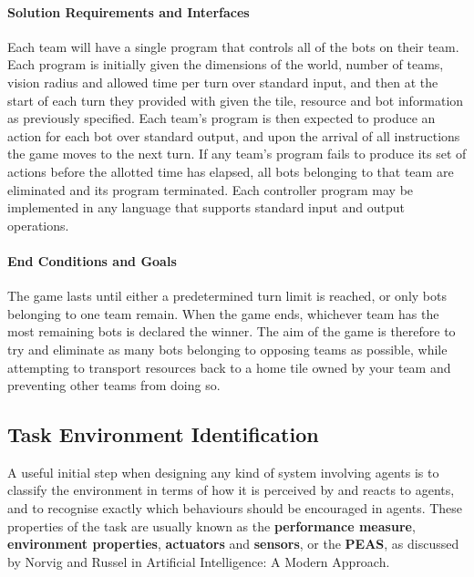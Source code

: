 \documentclass[a4paper,10pt]{article}
\begin{document}
\paragraph{Solution Requirements and Interfaces}
Each team will have a single program that controls all of the bots on their team. Each program is initially given the dimensions of the world, number of teams, vision radius and allowed time per turn over standard input, and then at the start of each turn they provided with given the tile, resource and bot information as previously specified. Each team's program is then expected to produce an action for each bot over standard output, and upon the arrival of all instructions the game moves to the next turn. If any team's program fails to produce its set of actions before the allotted time has elapsed, all bots belonging to that team are eliminated and its program terminated. Each controller program may be implemented in any language that supports standard input and output operations.

\paragraph{End Conditions and Goals}
The game lasts until either a predetermined turn limit is reached, or only bots belonging to one team remain. When the game ends, whichever team has the most remaining bots is declared the winner. The aim of the game is therefore to try and eliminate as many bots belonging to opposing teams as possible, while attempting to transport resources back to a home tile owned by your team and preventing other teams from doing so.

\subsection{Task Environment Identification}
A useful initial step when designing any kind of system involving agents is to classify the environment in terms of how it is perceived by and reacts to agents, and to recognise exactly which behaviours should be encouraged in agents. These properties of the task are usually known as the \textbf{performance measure}, \textbf{environment properties}, \textbf{actuators} and \textbf{sensors}, or the \textbf{PEAS}, as discussed by Norvig and Russel in Artificial Intelligence: A Modern Approach\cite{norvig10}.
\end{document}
